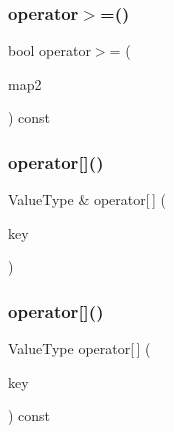 \mbox{\label{classMap_a1e36cb0cc936dcb2be3362158099bc8e}} 
\subsubsection{\texorpdfstring{operator$>$=()}{operator>=()}}
{\footnotesize\ttfamily bool operator$>$= (\begin{DoxyParamCaption}\item[{const \mbox{\hyperlink{classMap}{Map}}$<$ Key\+Type, Value\+Type $>$ \&}]{map2 }\end{DoxyParamCaption}) const}

\mbox{\label{classMap_a5bd092d78b82b4818d17917816a59730}} 
\subsubsection{\texorpdfstring{operator[]()}{operator[]()}\hspace{0.1cm}{\footnotesize\ttfamily [1/2]}}
{\footnotesize\ttfamily Value\+Type \& operator\mbox{[}$\,$\mbox{]} (\begin{DoxyParamCaption}\item[{const Key\+Type \&}]{key }\end{DoxyParamCaption})}

\mbox{\label{classMap_a9f52896b148cfbbc16e12ad1008971b1}} 
\subsubsection{\texorpdfstring{operator[]()}{operator[]()}\hspace{0.1cm}{\footnotesize\ttfamily [2/2]}}
{\footnotesize\ttfamily Value\+Type operator\mbox{[}$\,$\mbox{]} (\begin{DoxyParamCaption}\item[{const Key\+Type \&}]{key }\end{DoxyParamCaption}) const}

\mbox{\label{classMap_af0d1d70a37332cb3054fe5b1b170927c}} 
